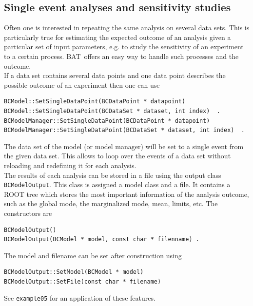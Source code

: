\documentclass[11pt, a4paper]{article}
\newcommand{\BAT}{{\sc BAT}}
\begin{document}
\pagebreak 


\subsection{Single event analyses and sensitivity studies}
\label{subsection:singleeventanalyses}

Often one is interested in repeating the same analysis on several data
sets. This is particularly true for estimating the expected outcome of
an analysis given a particular set of input parameters, e.g. to study
the sensitivity of an experiment to a certain process. \BAT\ offers an
easy way to handle such processes and the outcome. \\ 

\noindent 
If a data set contains several data points and one data point
describes the possible outcome of an experiment then one can use 
%
\begin{verbatim}
BCModel::SetSingleDataPoint(BCDataPoint * datapoint) 
BCModel::SetSingleDataPoint(BCDataSet * dataset, int index)  . 
BCModelManager::SetSingleDataPoint(BCDataPoint * datapoint) 
BCModelManager::SetSingleDataPoint(BCDataSet * dataset, int index)  . 
\end{verbatim} 
%
The data set of the model (or model manager) will be set to a single
event from the given data set. This allows to loop over the events of
a data set without reloading and redefining it for each analysis. \\ 

The results of each analysis can be stored in a file using the output
class \verb|BCModelOutput|. This class is assigned a model class and a
file. It contains a ROOT tree which stores the most important
information of the analysis outcome, such as the global mode, the
marginalized mode, mean, limits, etc. The constructors are 
%
\begin{verbatim}
BCModelOutput() 
BCModelOutput(BCModel * model, const char * filenname) .
\end{verbatim}
%
The model and filename can be set after construction using 
%
\begin{verbatim}
BCModelOutput::SetModel(BCModel * model) 
BCModelOutput::SetFile(const char * filename) 
\end{verbatim}
%
See \verb|example05| for an application of these features. 

\end{document}
